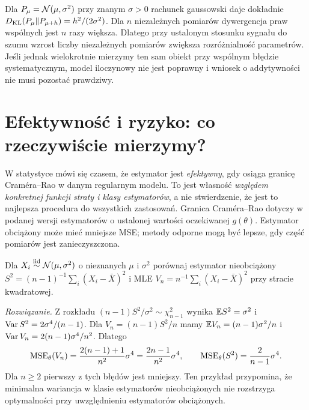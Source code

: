 \begin{przyklad}
Dla $P_\mu=\mathcal N(\mu,\sigma^2)$ przy znanym $\sigma>0$
rachunek gaussowski daje dokładnie
$D_{\rm KL}(P_\mu\|P_{\mu+h})=h^2/(2\sigma^2)$.
Dla $n$ niezależnych pomiarów dywergencja praw wspólnych jest
$n$ razy większa. Dlatego przy ustalonym stosunku sygnału
do szumu wzrost liczby niezależnych pomiarów zwiększa
rozróżnialność parametrów. Jeśli jednak wielokrotnie mierzymy
ten sam obiekt przy wspólnym błędzie systematycznym, model
iloczynowy nie jest poprawny i wniosek o addytywności nie musi
pozostać prawdziwy.
\end{przyklad}

\section{Efektywność i ryzyko: co rzeczywiście mierzymy?}
W statystyce mówi się czasem, że estymator jest \emph{efektywny},
gdy osiąga granicę Craméra--Rao w danym regularnym modelu.
To jest własność \emph{względem konkretnej funkcji straty i klasy
estymatorów}, a nie stwierdzenie, że jest to najlepsza procedura
do wszystkich zastosowań. Granica Craméra--Rao dotyczy w podanej
wersji estymatorów o ustalonej wartości oczekiwanej $g(\theta)$.
Estymator obciążony może mieć mniejsze MSE; metody odporne mogą
być lepsze, gdy część pomiarów jest zanieczyszczona.

\begin{zadanie}
Dla $X_i\mathrel{\overset{\mathrm{iid}}\sim}\mathcal N(\mu,\sigma^2)$ o nieznanych $\mu$ i
$\sigma^2$ porównaj estymator nieobciążony
$S^2=(n-1)^{-1}\sum_i(X_i-\bar X)^2$ i MLE
$V_n=n^{-1}\sum_i(X_i-\bar X)^2$ przy stracie kwadratowej.
\par\emph{Rozwiązanie.} Z rozkładu
$(n-1)S^2/\sigma^2\sim\chi^2_{n-1}$ wynika
$\mathbb E S^2=\sigma^2$ i $\operatorname{Var} S^2=2\sigma^4/(n-1)$.
Dla $V_n=(n-1)S^2/n$ mamy
$\mathbb E V_n=(n-1)\sigma^2/n$ i
$\operatorname{Var} V_n=2(n-1)\sigma^4/n^2$. Dlatego
\[
\operatorname{MSE}_\theta(V_n)=\frac{2(n-1)+1}{n^2}\sigma^4
=\frac{2n-1}{n^2}\sigma^4,
\qquad
\operatorname{MSE}_\theta(S^2)=\frac{2}{n-1}\sigma^4.
\]
Dla $n\ge2$ pierwszy z tych błędów jest mniejszy.
Ten przykład przypomina, że minimalna wariancja w klasie
estymatorów nieobciążonych nie rozstrzyga optymalności przy
uwzględnieniu estymatorów obciążonych.
\end{zadanie}

